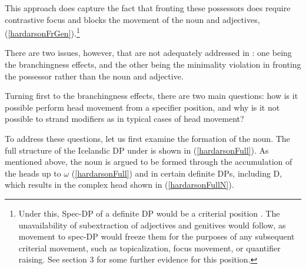 \documentclass[output=paper,colorlinks,citecolor=brown,
]{langscibook}
\begin{document}
\noindent This approach does capture the fact that fronting these possessors does require contrastive focus and blocks the movement of the noun and adjectives, (\ref{hardarsonFrGen}).\footnote{Under this, Spec-DP of a definite DP would be a criterial position \citep[cf.][]{Rizzi:2006ti,Boskovic:2008wp,wurmbrand2014,wurmbrand2015}. The unavailability of subextraction of adjectives and genitives would follow, as movement to spec-DP would freeze them for the purposes of any subsequent criterial movement, such as topicalization, focus movement, or quantifier raising. See section 3 for some further evidence for this position.}

\begin{exe}
\ex	\label{hardarsonFrGen}
	\begin{xlist}
	\setlength{\columnsep}{20pt}
	\begin{multicols}{2}
	\end{multicols}
	\end{xlist}
\end{exe}

There are two issues, however, that are not adequately addressed in \cite{Hardarson:2016wd}: one being the branchingness effects, and the other being the minimality violation in fronting the possessor rather than the noun and adjective.

Turning first to the branchingness effects, there are two main questions: how is it possible perform head movement from a specifier position, and why is it not possible to strand modifiers as in typical cases of head movement?

To address these questions, let us first examine the formation of the noun. The full structure of the Icelandic DP under \cite{Hardarson:2016wd} is shown in (\ref{hardarsonFull}). As mentioned above, the noun is argued to be formed through the accumulation of the heads up to $\omega$ (\ref{hardarsonFull}) and in certain definite DPs, including D, which results in the complex head shown in (\ref{hardarsonFullN}).
\end{document}
